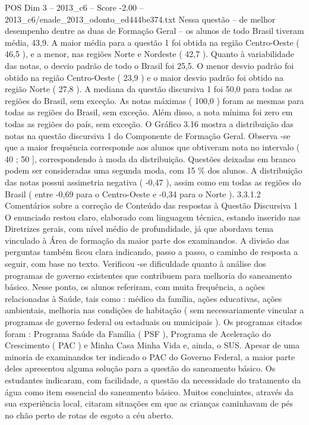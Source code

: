 \begin{textsample}{POS Dim 3 – 2013\_c6 – Score -2.00 – 2013\_c6/enade\_2013\_odonto\_ed444be374.txt}
Nessa questão – de melhor desempenho dentre as duas de Formação Geral – os alunos de todo Brasil tiveram média, 43,9.
A maior média para a questão 1 foi obtida na região Centro-Oeste ( 46,5 ), e a menor, nas regiões Norte e Nordeste ( 42,7 ).
Quanto à variabilidade das notas, o desvio padrão de todo o Brasil foi 25,5.
O menor desvio padrão foi obtido na região Centro-Oeste ( 23,9 ) e o maior desvio padrão foi obtido na região Norte ( 27,8 ).
A mediana da questão discursiva 1 foi 50,0 para todas as regiões do Brasil, sem exceção.
As notas máximas ( 100,0 ) foram as mesmas para todas as regiões do Brasil, sem exceção.
Além disso, a nota mínima foi zero em todas as regiões do país, sem exceção.
O Gráfico 3.16 mostra a distribuição das notas na questão discursiva 1 do Componente de Formação Geral.
Observa -se que a maior frequência corresponde aos alunos que obtiveram nota no intervalo ( 40 ; 50 ], correspondendo à moda da distribuição.
Questões deixadas em branco podem ser consideradas uma segunda moda, com 15 \% dos alunos.
A distribuição das notas possui assimetria negativa ( -0,47 ), assim como em todas as regiões do Brasil ( entre -0,69 para o Centro-Oeste e -0,34 para o Norte ). 3.3.1.2 Comentários sobre a correção de Conteúdo das respostas à Questão Discursiva 1 O enunciado restou claro, elaborado com linguagem técnica, estando inserido nas Diretrizes gerais, com nível médio de profundidade, já que abordava tema vinculado à Área de formação da maior parte dos examinandos.
A divisão das perguntas também ficou clara indicando, passo a passo, o caminho de resposta a seguir, com base no texto.
Verificou -se dificuldade quanto à análise dos programas de governo existentes que contribuem para melhoria do saneamento básico.
Nesse ponto, os alunos referiram, com muita frequência, a ações relacionadas à Saúde, tais como : médico da família, ações educativas, ações ambientais, melhoria nas condições de habitação ( sem necessariamente vincular a programas de governo federal ou estaduais ou municipais ).
Os programas citados foram : Programa Saúde da Família ( PSF ), Programa de Aceleração do Crescimento ( PAC ) e Minha Casa Minha Vida e, ainda, o SUS.
Apesar de uma minoria de examinandos ter indicado o PAC do Governo Federal, a maior parte deles apresentou alguma solução para a questão do saneamento básico.
Os estudantes indicaram, com facilidade, a questão da necessidade do tratamento da água como item essencial do saneamento básico.
Muitos concluintes, através da sua experiência local, citaram situações em que as crianças caminhavam de pés no chão perto de rotas de esgoto a céu aberto.

\end{textsample}
